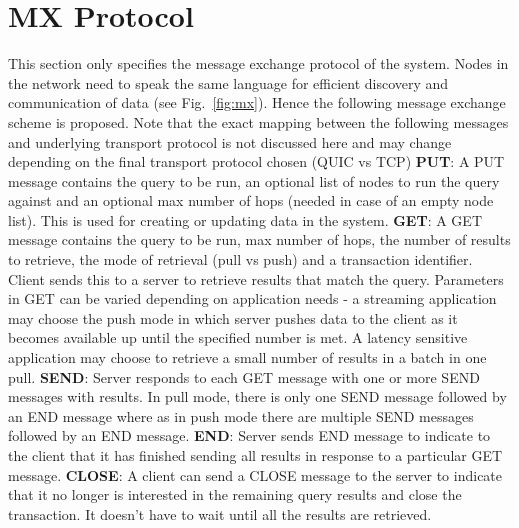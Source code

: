 \documentclass[preprint,10pt]{elsarticle}
\newcommand{\figref}[1]{Fig.~\ref{#1}}
\begin{document}
\section{MX Protocol}
This section only specifies the message exchange protocol of the system. Nodes in the network need to speak the same language for efficient discovery and communication of data (see \figref{fig:mx}). Hence the following message exchange scheme is proposed. Note that the exact mapping between the following messages and underlying transport protocol is not discussed here and may change depending on the final transport protocol chosen (QUIC vs TCP)
\newline
\newline
\textbf{PUT}:  A PUT message contains the query to be run, an optional list of nodes to run the query against and an optional max number of hops (needed in case of an empty node list). This is used for creating or updating data in the system.
\newline
\newline
\textbf{GET}: A GET message contains the query to be run, max number of hops, the number of results to retrieve, the mode of retrieval (pull vs push) and a transaction identifier. Client sends this to a server to retrieve results that match the query. Parameters in GET can be varied depending on application needs - a streaming application may choose the push mode in which server pushes data to the client as it becomes available up until the specified number is met. A latency sensitive application may choose to retrieve a small number of results in a batch in one pull.
\newline
\newline
\textbf{SEND}: Server responds to each GET message with one or more SEND messages with results. In pull mode, there is only one SEND message followed by an END message where as in push mode there are multiple SEND messages followed by an END message.
\newline
\newline
\textbf{END}: Server sends END message to indicate to the client that it has finished sending all results in response to a particular GET message.
\newline
\newline
\textbf{CLOSE}: A client can send a CLOSE message to the server to indicate that it no longer is interested in the remaining query results and close the transaction. It doesn't have to wait until all the results are retrieved.
\newline
\end{document}
